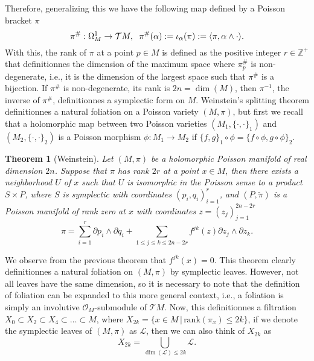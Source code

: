 \documentclass[12pt,twoside,a4paper]{report}
\newtheorem{theorem}{Theorem}[section]
\newcommand{\zah}{\ensuremath{ \mathbb Z }}
\begin{document}
Therefore, generalizing this we have the following map defined by a Poisson bracket $\pi$
\[
        \pi^{\#}:\Omega^1_M\rightarrow\mathcal{T}M,\hspace{0.2cm}\pi^{\#}(\alpha):=\iota_{\alpha}(\pi):=\langle\pi,\alpha\wedge\cdot\rangle.
\]
\noindent With this, the rank of $\pi$ at a point $p\in M$ is defined as the positive integer $r\in \zah^{+}$ that definitionnes the dimension of the
maximum space where $\pi^{\#}_p$ is non-degenerate, i.e., it is the dimension of the largest space such that $\pi^{\#}$ is a
bijection. If $\pi^{\#}$ is non-degenerate, its rank is $2n=\dim(M)$, then $\pi^{-1}$, the inverse of $\pi^{\#}$, definitionnes a symplectic form
on $M$. Weinstein's splitting theorem definitionnes a natural foliation on a Poisson variety $(M,\pi)$, but first
we recall that a holomorphic map between two Poisson varieties $(M_1,\{\cdot,\cdot\}_1)$ and $(M_2,\{\cdot,\cdot\}_2)$ is a Poisson morphism
$\phi:M_1\rightarrow M_2$ if $\{f,g\}_1\circ\phi=\{f\circ\phi,g\circ\phi\}_2$.
\begin{theorem}[Weinstein]\label{weins}
        Let $(M,\pi)$ be a holomorphic Poisson manifold of real dimension $2n$. Suppose that $\pi$ has rank $2r$ at a point $x\in M$,
        then there exists a neighborhood $U$ of $x$ such that $U$ is isomorphic in the Poisson sense to a product $S\times P$, where $S$ is
        symplectic with coordinates $(p_i,q_i)_{i=1}^r$, and $(P,\tilde{\pi})$ is a Poisson manifold of rank zero at $x$
        with coordinates $z=(z_j)_{j=1}^{2n-2r}$
        \[
                \pi=\sum_{i=1}^r \partial{p_i}\wedge\partial{q_i}+\sum_{1\leq j\leq k\leq 2n-2r} f^{jk}(z)\partial{z_j}\wedge\partial{z_k}.
        \]
\end{theorem}
\noindent We observe from the previous theorem that $f^{jk}(x)=0$. This theorem clearly definitionnes a natural foliation on $(M,\pi)$ by
symplectic leaves. However, not all leaves have the same dimension, so it is necessary to note that the definition of foliation
can be expanded to this more general context, i.e., a foliation is simply an involutive $\mathcal{O}_M$-submodule of $\mathcal{T}M$.
Now, this definitionnes a filtration $X_0\subset X_2\subset X_4\subset\dots\subset M$, where $X_{2k}=\{x\in M\,|\,\textrm{rank}(\pi_x)\leq 2k\}$,
if we denote the symplectic leaves of $(M,\pi)$ as $\mathcal{L}$, then we can also think of $X_{2k}$ as
$$
X_{2k}=\bigcup_{\dim(\mathcal{L})\leq 2k}\mathcal{L}.
$$
\end{document}
